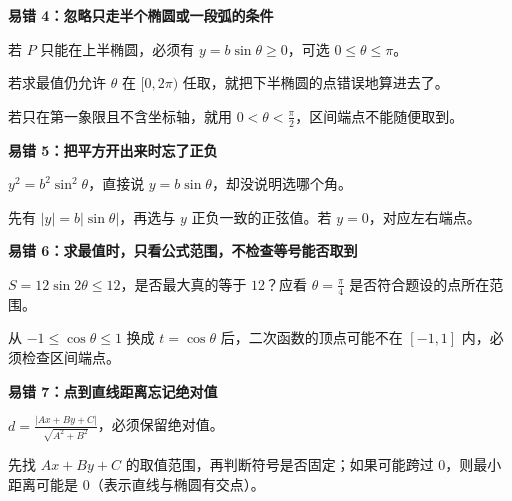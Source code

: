 \begin{trapbox}
\medskip
\par\noindent\begin{minipage}{\linewidth}
\textbf{\textcolor{CTrap}{易错 4：忽略只走半个椭圆或一段弧的条件}}


\end{minipage}\par
\begin{description}[style=nextline,leftmargin=2.8em,labelsep=0.5em,itemsep=0.35em]
\item[\textbf{举例：}] 若 $P$ 只能在上半椭圆，必须有 $y=b\sin\theta\ge0$，可选 $0\le\theta\le\pi$。
\item[\textbf{后果：}] 若求最值仍允许 $\theta$ 在 $[0,2\pi)$ 任取，就把下半椭圆的点错误地算进去了。
\item[\textbf{再提醒：}] 若只在第一象限且不含坐标轴，就用 $0<\theta<\frac\pi2$，区间端点不能随便取到。
\end{description}

\medskip
\textbf{\textcolor{CTrap}{易错 5：把平方开出来时忘了正负}}
\begin{description}[style=nextline,leftmargin=2.8em,labelsep=0.5em,itemsep=0.35em]
\item[\textbf{错误跳步：}] $y^2=b^2\sin^2\theta$，直接说 $y=b\sin\theta$，却没说明选哪个角。
\item[\textbf{正确做法：}] 先有 $|y|=b|\sin\theta|$，再选与 $y$ 正负一致的正弦值。若 $y=0$，对应左右端点。
\end{description}

\medskip
\textbf{\textcolor{CTrap}{易错 6：求最值时，只看公式范围，不检查等号能否取到}}
\begin{description}[style=nextline,leftmargin=2.8em,labelsep=0.5em,itemsep=0.35em]
\item[\textbf{例子：}] $S=12\sin2\theta\le12$，是否最大真的等于 $12$？应看 $\theta=\frac\pi4$ 是否符合题设的点所在范围。
\item[\textbf{推广：}] 从 $-1\le\cos\theta\le1$ 换成 $t=\cos\theta$ 后，二次函数的顶点可能不在 $[-1,1]$ 内，必须检查区间端点。
\end{description}

\medskip
\textbf{\textcolor{CTrap}{易错 7：点到直线距离忘记绝对值}}
\begin{description}[style=nextline,leftmargin=2.8em,labelsep=0.5em,itemsep=0.35em]
\item[\textbf{距离公式：}] $d=\frac{|Ax+By+C|}{\sqrt{A^2+B^2}}$，必须保留绝对值。
\item[\textbf{正确顺序：}] 先找 $Ax+By+C$ 的取值范围，再判断符号是否固定；如果可能跨过 $0$，则最小距离可能是 $0$（表示直线与椭圆有交点）。
\end{description}


\end{trapbox}
